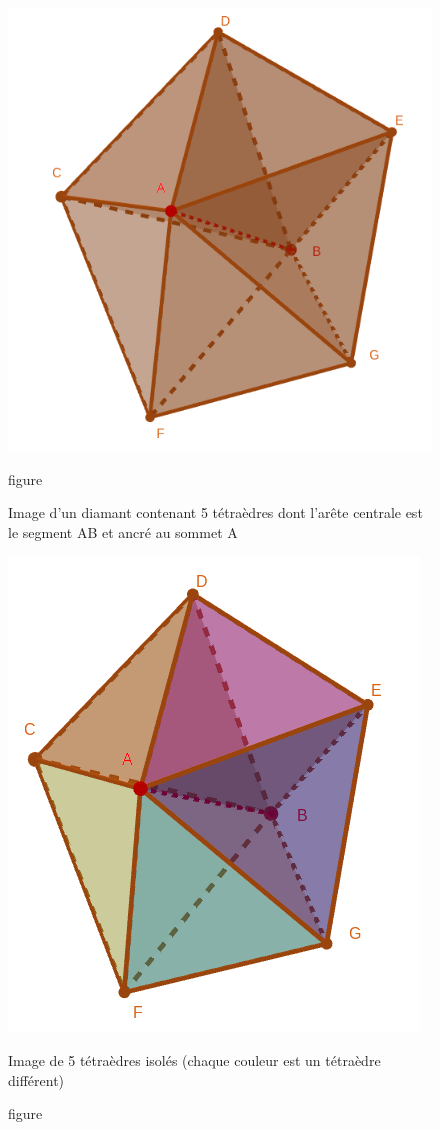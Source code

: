 \documentclass[a4paper,11pt,openany]{article}
\begin{document}
\begin{figure}[H]
\centering
\begin{minipage}{.5\textwidth}
  \centering
  \includegraphics[scale=0.35]{Images/central_edge_AB}
  \caption{figure}{Image d'un diamant contenant 5 tétraèdres dont l'arête centrale est le segment AB et ancré au sommet A}
  \label{fig:central_edge_AB}
\end{minipage}%
\begin{minipage}{.5\textwidth}
  \centering
  \includegraphics[scale=0.42]{Images/explosion_diamond}
  \caption{figure}{Image de 5 tétraèdres isolés (chaque couleur est un tétraèdre différent)}
  \label{fig:explosion_diamond}
\end{minipage}
\end{figure}
\end{document}

